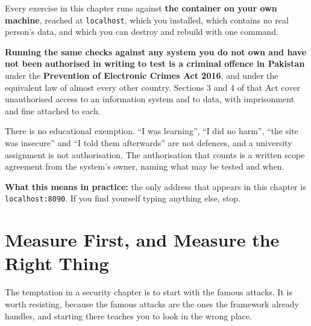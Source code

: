 \begin{alertbox}
Every exercise in this chapter runs against \textbf{the container on your own
machine}, reached at \texttt{localhost}, which you installed, which contains no
real person's data, and which you can destroy and rebuild with one command.

\smallskip
\textbf{Running the same checks against any system you do not own and have not
been authorised in writing to test is a criminal offence in Pakistan} under the
\textbf{Prevention of Electronic Crimes Act 2016}, and under the equivalent law
of almost every other country. Sections 3 and 4 of that Act cover unauthorised
access to an information system and to data, with imprisonment and fine
attached to each.

\smallskip
There is no educational exemption. ``I was learning'', ``I did no harm'', ``the
site was insecure'' and ``I told them afterwards'' are not defences, and a
university assignment is not authorisation. The authorisation that counts is a
written scope agreement from the system's owner, naming what may be tested and
when.

\smallskip
\textbf{What this means in practice:} the only address that appears in this
chapter is \texttt{localhost:8090}. If you find yourself typing anything else,
stop.
\end{alertbox}

\section{Measure First, and Measure the Right Thing}

The temptation in a security chapter is to start with the famous attacks. It is
worth resisting, because the famous attacks are the ones the framework already
handles, and starting there teaches you to look in the wrong place.

